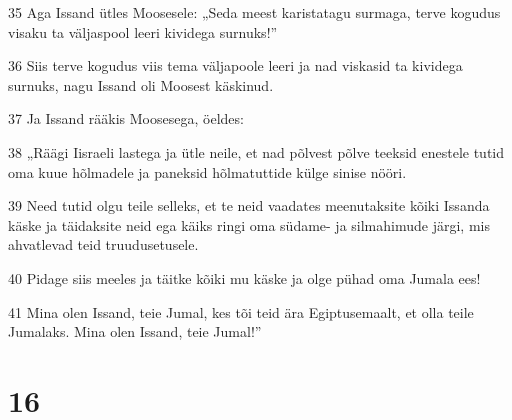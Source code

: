 \par 35 Aga Issand ütles Moosesele: „Seda meest karistatagu surmaga, terve kogudus visaku ta väljaspool leeri kividega surnuks!”
\par 36 Siis terve kogudus viis tema väljapoole leeri ja nad viskasid ta kividega surnuks, nagu Issand oli Moosest käskinud.
\par 37 Ja Issand rääkis Moosesega, öeldes:
\par 38 „Räägi Iisraeli lastega ja ütle neile, et nad põlvest põlve teeksid enestele tutid oma kuue hõlmadele ja paneksid hõlmatuttide külge sinise nööri.
\par 39 Need tutid olgu teile selleks, et te neid vaadates meenutaksite kõiki Issanda käske ja täidaksite neid ega käiks ringi oma südame- ja silmahimude järgi, mis ahvatlevad teid truudusetusele.
\par 40 Pidage siis meeles ja täitke kõiki mu käske ja olge pühad oma Jumala ees!
\par 41 Mina olen Issand, teie Jumal, kes tõi teid ära Egiptusemaalt, et olla teile Jumalaks. Mina olen Issand, teie Jumal!”

\chapter{16}


